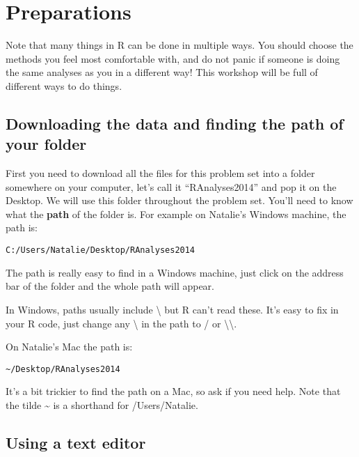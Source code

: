 \documentclass[11pt]{article}
\begin{document}
\newpage{}
\section{Preparations}

\begin{framed}
Note that many things in R can be done in multiple ways. You should
choose the methods you feel most comfortable with, and do not panic if
someone is doing the same analyses as you in a different way! This
workshop will be full of different ways to do things.
\end{framed}

\subsection{Downloading the data and finding the path of your folder}

First you need to download all the files for this problem set into a
folder somewhere on your computer, let's call it ``RAnalyses2014'' and
pop it on the Desktop. We will use this folder throughout the problem
set. You'll need to know what the \textbf{path} of the folder is. For
example on Natalie's Windows machine, the path is:

\begin{snugshade}
\texttt{C:/Users/Natalie/Desktop/RAnalyses2014}
\end{snugshade}

The path is really easy to find in a Windows machine, just click on the
address bar of the folder and the whole path will appear.

\begin{framed}
In Windows, paths usually include \textbackslash{} but R
can't read these. It's easy to fix in your R code, just change any \textbackslash{} in
the path to / or \textbackslash{}\textbackslash{}.
\end{framed}

On Natalie's Mac the path is:

\begin{snugshade}
\texttt{\textasciitilde{}/Desktop/RAnalyses2014}
\end{snugshade}

It's a bit trickier to find the path on a Mac, so ask if you need help. 
Note that the tilde \textasciitilde{} is a shorthand for /Users/Natalie. 

\subsection{Using a text editor}
\end{document}
